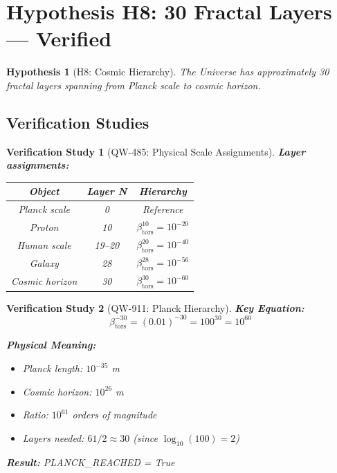 \documentclass[11pt, a4paper]{article}
\newtheorem{hypothesis}{Hypothesis}[section]
\newtheorem{verification}{Verification Study}[section]
\theoremstyle{remark}
\newcommand{\betators}{\beta_{\text{tors}}}
\begin{document}
\section{Hypothesis H8: 30 Fractal Layers --- Verified}

\begin{hypothesis}[H8: Cosmic Hierarchy]
The Universe has approximately 30 fractal layers spanning from Planck scale to cosmic horizon.
\end{hypothesis}

\subsection{Verification Studies}

\begin{verification}[QW-485: Physical Scale Assignments]
\textbf{Layer assignments:}
\begin{center}
\begin{tabular}{|c|c|c|}
\hline
\textbf{Object} & \textbf{Layer N} & \textbf{Hierarchy} \\
\hline
Planck scale & 0 & Reference \\
Proton & 10 & $\betators^{10} = 10^{-20}$ \\
Human scale & 19--20 & $\betators^{20} = 10^{-40}$ \\
Galaxy & 28 & $\betators^{28} = 10^{-56}$ \\
Cosmic horizon & 30 & $\betators^{30} = 10^{-60}$ \\
\hline
\end{tabular}
\end{center}
\end{verification}

\begin{verification}[QW-911: Planck Hierarchy]
\textbf{Key Equation:}
\begin{equation}
\boxed{\betators^{-30} = (0.01)^{-30} = 100^{30} = 10^{60}}
\end{equation}

\textbf{Physical Meaning:}
\begin{itemize}
    \item Planck length: $10^{-35}$ m
    \item Cosmic horizon: $10^{26}$ m
    \item Ratio: $10^{61}$ orders of magnitude
    \item Layers needed: $61 / 2 \approx 30$ (since $\log_{10}(100) = 2$)
\end{itemize}

\textbf{Result:} PLANCK\_REACHED = True
\end{verification}
\end{document}
